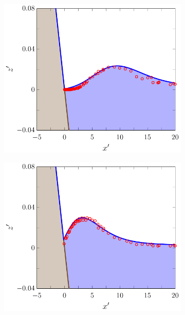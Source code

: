 \begin{figure}
	\centering
	\begin{subfigure}{0.5\textwidth}
		\includegraphics[width=\textwidth]{./chp6/figures/Experiment/Synolakis/H0p0185/FEVM/30s.pdf}
		\vspace{0.5cm}
	\end{subfigure}%
	\begin{subfigure}{0.5\textwidth}
		\includegraphics[width=\textwidth]{./chp6/figures/Experiment/Synolakis/H0p0185/FEVM/40s.pdf}

\end{subfigure}
\end{figure}
